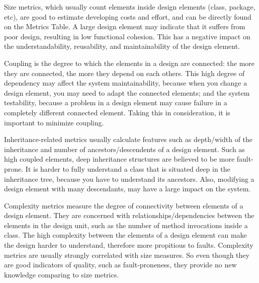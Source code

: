 Size metrics, which usually count elements inside design elements (class, package, etc), are good to estimate developing costs and effort, and can be directly found on the Metrics Table.
A large design element may indicate that it suffers from poor design, resulting in low functional cohesion. This 	has a negative impact on the understandability, reusability, and maintainability of the design element.

Coupling is the degree to which the elements in a design are connected: the more they are connected, the more they depend on each others. This high degree of dependency may affect the system maintainability, because when you change a design element, you may need to adapt the connected elements; and the system testability, because a problem in a design element may cause failure in a completely different connected element. Taking this in consideration, it is important to minimize coupling.

Inheritance-related metrics usually calculate features such as depth/width of the inheritance and number of ancestors/descendents of a design element. Such as high coupled elements, deep inheritance structures are believed to be more fault-prone. It is harder to fully understand a class that is situated deep in the inheritance tree, because you have to understand its ancestors. Also, modifying a design element with many descendants, may have a large impact on the system.

Complexity metrics measure the degree of connectivity between elements of a design element. They are concerned with relationships/dependencies between the elements in the design unit, such as the number of method invocations inside a class. The high complexity between the elements of a design element can make the design harder to understand, therefore more propitious to faults. Complexity metrics are usually strongly correlated with size measures. So even though they are good indicators of quality, such as fault-proneness, they provide no new knowledge comparing to size metrics.
